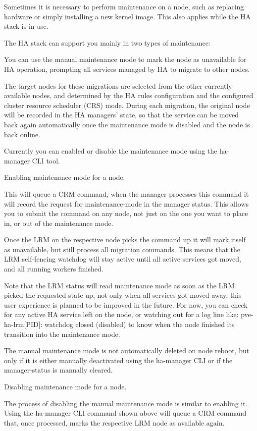 Sometimes it is necessary to perform maintenance on a node, such as replacing hardware or simply installing a new kernel image. This also applies while the HA stack is in use.

The HA stack can support you mainly in two types of maintenance:

You can use the manual maintenance mode to mark the node as unavailable for HA operation, prompting all services managed by HA to migrate to other nodes.

The target nodes for these migrations are selected from the other currently available nodes, and determined by the HA rules configuration and the configured cluster resource scheduler (CRS) mode. During each migration, the original node will be recorded in the HA managers' state, so that the service can be moved back again automatically once the maintenance mode is disabled and the node is back online.

Currently you can enabled or disable the maintenance mode using the ha-manager CLI tool.

Enabling maintenance mode for a node.

This will queue a CRM command, when the manager processes this command it will record the request for maintenance-mode in the manager status. This allows you to submit the command on any node, not just on the one you want to place in, or out of the maintenance mode.

Once the LRM on the respective node picks the command up it will mark itself as unavailable, but still process all migration commands. This means that the LRM self-fencing watchdog will stay active until all active services got moved, and all running workers finished.

Note that the LRM status will read maintenance mode as soon as the LRM picked the requested state up, not only when all services got moved away, this user experience is planned to be improved in the future. For now, you can check for any active HA service left on the node, or watching out for a log line like: pve-ha-lrm[PID]: watchdog closed (disabled) to know when the node finished its transition into the maintenance mode.

The manual maintenance mode is not automatically deleted on node reboot, but only if it is either manually deactivated using the ha-manager CLI or if the manager-status is manually cleared.

Disabling maintenance mode for a node.

The process of disabling the manual maintenance mode is similar to enabling it. Using the ha-manager CLI command shown above will queue a CRM command that, once processed, marks the respective LRM node as available again.

